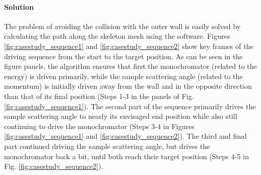 \paragraph{Solution}
The problem of avoiding the collision with the outer wall  is easily solved by calculating the
path along the skeleton mesh using the software. Figures \ref{fig:casestudy_sequence1} and 
\ref{fig:casestudy_sequence2} show key frames of the driving sequence from the start to the 
target position.
As can be seen in the figure panels, the algorithm ensures that first the monochromator 
(related to the energy) is driven primarily, while the sample scattering angle (related to the momentum) 
is initially driven away from the wall and in the opposite direction than that of its final position (Steps 1-3
in the panels of Fig. \ref{fig:casestudy_sequence1}).
The second part of the sequence primarily drives the sample scattering angle to nearly its
envisaged end position while also still continuing to drive the monochromator (Steps 3-4
in Figures \ref{fig:casestudy_sequence1} and \ref{fig:casestudy_sequence2}).
The third and final part continued driving the sample scattering angle, but drives the monochromator
back a bit, until both reach their target position (Steps 4-5 in Fig. \ref{fig:casestudy_sequence2}).

